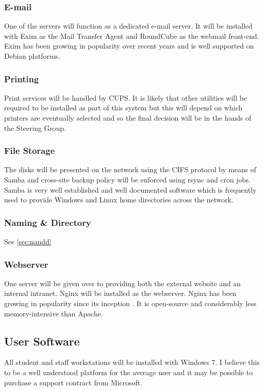 \documentclass[a4paper, twoside]{article}
\begin{document}
\subsubsection{E-mail}
One of the servers will function as a dedicated e-mail server. It will be
installed with Exim as the Mail Transfer Agent and RoundCube as the webmail
front-end. Exim has been growing in popularity over recent years and is well
supported on Debian platforms\cite{exim}.

\subsubsection{Printing}
Print services will be handled by CUPS. It is likely that other utilities will
be required to be installed as part of this system but this will depend on which
printers are eventually selected and so the final decision will be in the hands
of the Steering Group.

\subsubsection{File Storage}
The disks will be presented on the network using the CIFS protocol by means of
Samba and cross-site backup policy will be enforced using rsync and cron jobs.
Samba is very well established and well documented software which is frequently
used to provide Windows and Linux home directories across the network.

\subsubsection{Naming \& Directory}
See \ref{sec:nandd}

\subsubsection{Webserver}
One server will be given over to providing both the external website and an
internal intranet. Nginx will be installed as the webserver. Nginx has been
growing in popularity since its inception \cite{nginx}. It is open-source and
considerably less memory-intensive than Apache.

\subsection{User Software}
All student and staff workstations will be installed with Windows 7. I believe
this to be a well understood platform for the average user and it may be
possible to purchase a support contract from Microsoft.
\end{document}
